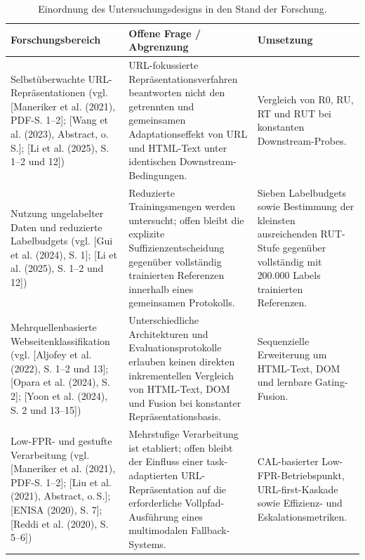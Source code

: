\begin{table}[!ht]
\centering
\caption{Einordnung des Untersuchungsdesigns in den Stand der Forschung.}
\label{tab:forschungsableitung}

\footnotesize
\setlength{\tabcolsep}{4pt}
\renewcommand{\arraystretch}{1.08}

\begin{tabular}{@{}>{\raggedright\arraybackslash}p{3.7cm}>{\raggedright\arraybackslash}p{4.5cm}>{\raggedright\arraybackslash}p{5.0cm}@{}}
\toprule
\textbf{Forschungsbereich}
&
\textbf{Offene Frage / Abgrenzung}
&
\textbf{Umsetzung}
\\
\midrule

Selbstüberwachte URL-Repräsentationen
(vgl. [Maneriker et al. (2021), PDF-S. 1--2]; [Wang et al. (2023), Abstract, o.\,S.]; [Li et al. (2025), S. 1--2 und 12])
&
URL-fokussierte Repräsentationsverfahren beantworten nicht den getrennten und gemeinsamen
Adaptationseffekt von URL und HTML-Text unter identischen Downstream-Bedingungen.
&
Vergleich von R0, RU, RT und RUT bei konstanten Downstream-Probes.
\\[1mm]

Nutzung ungelabelter Daten und reduzierte Labelbudgets
(vgl. [Gui et al. (2024), S. 1]; [Li et al. (2025), S. 1--2 und 12])
&
Reduzierte Trainingsmengen werden untersucht; offen bleibt die explizite
Suffizienzentscheidung gegenüber vollständig trainierten Referenzen innerhalb eines
gemeinsamen Protokolls.
&
Sieben Labelbudgets sowie Bestimmung der kleinsten ausreichenden
RUT-Stufe gegenüber vollständig mit 200.000 Labels trainierten Referenzen.
\\[1mm]

Mehrquellenbasierte Webseitenklassifikation
(vgl. [Aljofey et al. (2022), S. 1--2 und 13]; [Opara et al. (2024), S. 2]; [Yoon et al. (2024), S. 2 und 13--15])
&
Unterschiedliche Architekturen und Evaluationsprotokolle erlauben keinen direkten
inkrementellen Vergleich von HTML-Text, DOM und Fusion bei konstanter
Repräsentationsbasis.
&
Sequenzielle Erweiterung um HTML-Text, DOM und lernbare Gating-Fusion.
\\[1mm]

Low-FPR- und gestufte Verarbeitung
(vgl. [Maneriker et al. (2021), PDF-S. 1--2]; [Liu et al. (2021), Abstract, o.\,S.]; [ENISA (2020), S. 7]; [Reddi et al. (2020), S. 5--6])
&
Mehrstufige Verarbeitung ist etabliert; offen bleibt der Einfluss einer task-adaptierten
URL-Repräsentation auf die erforderliche Vollpfad-Ausführung eines multimodalen
Fallback-Systems.
&
CAL-basierter Low-FPR-Betriebspunkt, URL-first-Kaskade sowie
Effizienz- und Eskalationsmetriken.
\\

\bottomrule
\end{tabular}
\end{table}
